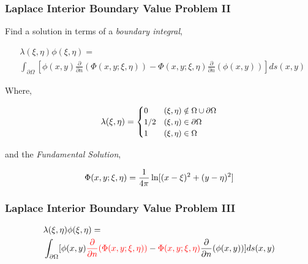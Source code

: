 \begin{frame}
    \frametitle{Laplace Interior Boundary Value Problem II}

    Find a solution in terms of a \textit{boundary integral},

    \begin{equation}
        \begin{aligned}
        & \lambda(\xi, \eta)\phi(\xi, \eta) = \\
        &  \int_{\partial \Omega} [\phi(x, y) \frac{\partial}{\partial n}(\Phi(x, y; \xi, \eta)) - \Phi(x, y; \xi, \eta)\frac{\partial}{\partial n}(\phi(x, y))] ds(x, y)
        \end{aligned}
    \end{equation}

    Where,

  \begin{equation}
    \small
     \lambda(\xi, \eta) =
        \begin{cases}
          0 & (\xi, \eta) \notin \Omega \cup \partial \Omega\\
          1/2 & (\xi, \eta) \in \partial \Omega \\
          1 & (\xi, \eta) \in \Omega
        \end{cases}
    \end{equation}

  \hspace*{5pt}

  and the \textit{Fundamental Solution},

  \begin{equation}
    \small
    \Phi(x,y; \xi, \eta) = \frac{1}{4\pi} \ln [(x-\xi)^2 + (y-\eta)^2]
  \end{equation}

\end{frame}

\begin{frame}
    \frametitle{Laplace Interior Boundary Value Problem III}
    \begin{equation}
        \begin{aligned}
            & \lambda(\xi, \eta)\phi(\xi, \eta) = \\
            & \int_{\partial \Omega} [\phi(x, y) \color{red} \frac{\partial}{\partial n}(\Phi(x, y; \xi, \eta))  \color{black} - \color{red} \Phi(x, y; \xi, \eta) \color{black}\frac{\partial}{\partial n}(\phi(x, y))] ds(x, y)
        \end{aligned}
    \end{equation}
\end{frame}

